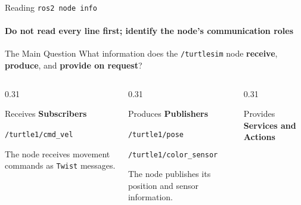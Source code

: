 \begin{frame}{Reading \texttt{ros2 node info} }
\framesubtitle{Do not read every line first; identify the node's communication roles}

\footnotesize

\begin{block}{The Main Question}
    What information does the \texttt{/turtlesim} node
    \textbf{receive}, \textbf{produce}, and \textbf{provide on request}?
\end{block}

\pause

\begin{columns}[T,onlytextwidth]

    \begin{column}{0.31\textwidth}
        \begin{exampleblock}{Receives}
            \centering
            \textbf{Subscribers}

            \vspace{0.12cm}

            \texttt{/turtle1/cmd\_vel}

            \vspace{0.12cm}

            \scriptsize
            The node receives movement commands as
            \texttt{Twist} messages.
        \end{exampleblock}
    \end{column}

    \hfill

    \begin{column}{0.31\textwidth}
        \begin{exampleblock}{Produces}
            \centering
            \textbf{Publishers}

            \vspace{0.12cm}

            \texttt{/turtle1/pose}

            \texttt{/turtle1/color\_sensor}

            \vspace{0.12cm}

            \scriptsize
            The node publishes its position and sensor information.
        \end{exampleblock}
    \end{column}

    \hfill

    \begin{column}{0.31\textwidth}
        \begin{exampleblock}{Provides}
            \centering
            \textbf{Services and Actions}


\end{exampleblock}
\end{column}
\end{columns}
\end{frame}

